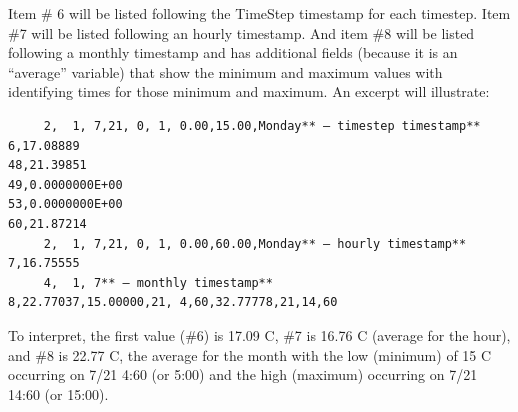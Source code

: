 Item \# 6 will be listed following the TimeStep timestamp for each timestep. Item \#7 will be listed following an hourly timestamp. And item \#8 will be listed following a monthly timestamp and has additional fields (because it is an “average” variable) that show the minimum and maximum values with identifying times for those minimum and maximum. An excerpt will illustrate:

\begin{lstlisting}
     2,  1, 7,21, 0, 1, 0.00,15.00,Monday** – timestep timestamp**
6,17.08889
48,21.39851
49,0.0000000E+00
53,0.0000000E+00
60,21.87214
     2,  1, 7,21, 0, 1, 0.00,60.00,Monday** – hourly timestamp**
7,16.75555
     4,  1, 7** – monthly timestamp**
8,22.77037,15.00000,21, 4,60,32.77778,21,14,60
\end{lstlisting}

To interpret, the first value (\#6) is 17.09 C, \#7 is 16.76 C (average for the hour), and \#8 is 22.77 C, the average for the month with the low (minimum) of 15 C occurring on 7/21 4:60 (or 5:00) and the high (maximum) occurring on 7/21 14:60 (or 15:00).
